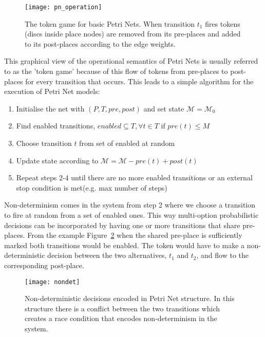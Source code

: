 \begin{figure}
\centering
\texttt{[image: pn\_operation]}
\caption[Token game for basic Petri Nets]{The token game for basic Petri Nets. When transition $t_1$
  fires tokens (discs inside place nodes) are removed from its
  pre-places and added to its post-places according to the edge weights.}
\label{fig:pn_operation}
\end{figure}

This graphical view of the operational semantics of Petri Nets is
usually referred to as the 'token game' because of this flow of tokens
from pre-places to post-places for every transition that occurs. This
leads to a simple algorithm for the execution of Petri Net models:

\begin{enumerate}[noitemsep]
\item Initialise the net  with $(P, T, pre, post)$ and set state $\mathcal{M} = \mathcal{M}_0$
\item Find enabled transitions, $enabled \subseteq T, \forall t \in T \mbox{ if } pre(t) \leq M$
\item Choose transition $t$ from set of enabled at random
\item Update state according to $\mathcal{M} = \mathcal{M} -pre(t) + post(t)$
\item Repeat steps 2-4 until there are no more enabled transitions or an external stop condition is met(e.g. max number of steps)
\end{enumerate}
Non-determinism comes in the system from step 2 where we choose a
transition to fire at random from a set of enabled ones. This way multi-option
probabilistic decisions can be incorporated by having one or more
transitions that share pre-places. From the
example Figure~\ref{fig:nondet} when the shared pre-place is
sufficiently marked both transitions would be enabled. The token would
have to make a non-deterministic decision between the two
alternatives, $t_1$ and $t_2$, and flow to the corresponding
post-place.

\begin{figure}
\centering
\texttt{[image: nondet]}
\caption[Non-determinism in Petri Net structure]{Non-deterministic decisions encoded in Petri Net
  structure. In this structure there is a conflict between the two
  transitions which creates a race condition that encodes
  non-determinism in the system.}
\label{fig:nondet}
\end{figure}

